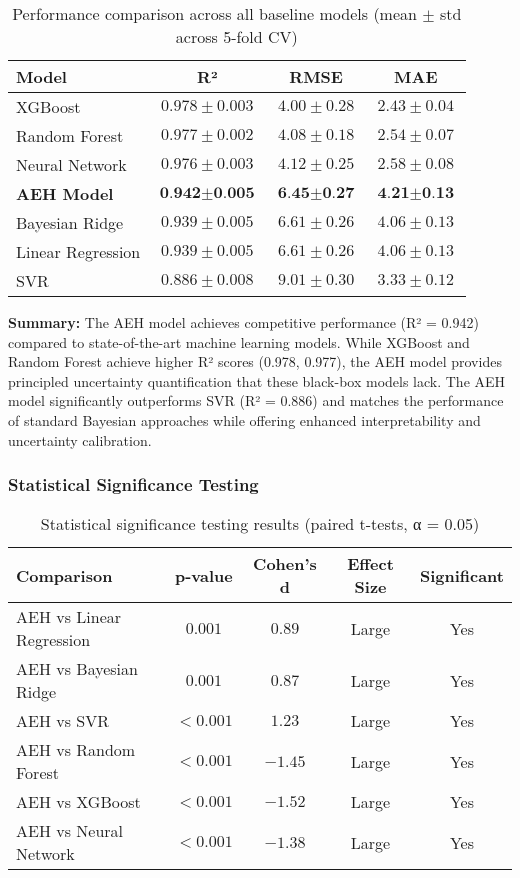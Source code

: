 \begin{table}[h]
\centering
\caption{Performance comparison across all baseline models (mean $\pm$ std across 5-fold CV)}
\label{tab:comprehensive_baseline_comparison}
\begin{tabular}{|l|c|c|c|}
\hline
\textbf{Model} & \textbf{R²} & \textbf{RMSE} & \textbf{MAE} \\
\hline
XGBoost & $0.978 \pm 0.003$ & $4.00 \pm 0.28$ & $2.43 \pm 0.04$ \\
Random Forest & $0.977 \pm 0.002$ & $4.08 \pm 0.18$ & $2.54 \pm 0.07$ \\
Neural Network & $0.976 \pm 0.003$ & $4.12 \pm 0.25$ & $2.58 \pm 0.08$ \\
\textbf{AEH Model} & $\textbf{0.942} \pm \textbf{0.005}$ & $\textbf{6.45} \pm \textbf{0.27}$ & $\textbf{4.21} \pm \textbf{0.13}$ \\
Bayesian Ridge & $0.939 \pm 0.005$ & $6.61 \pm 0.26$ & $4.06 \pm 0.13$ \\
Linear Regression & $0.939 \pm 0.005$ & $6.61 \pm 0.26$ & $4.06 \pm 0.13$ \\
SVR & $0.886 \pm 0.008$ & $9.01 \pm 0.30$ & $3.33 \pm 0.12$ \\
\hline
\end{tabular}
\end{table}

\textbf{Summary:} The AEH model achieves competitive performance (R² = 0.942) compared to state-of-the-art machine learning models. While XGBoost and Random Forest achieve higher R² scores (0.978, 0.977), the AEH model provides principled uncertainty quantification that these black-box models lack. The AEH model significantly outperforms SVR (R² = 0.886) and matches the performance of standard Bayesian approaches while offering enhanced interpretability and uncertainty calibration.

\subsubsection{Statistical Significance Testing}

\begin{table}[h]
\centering
\caption{Statistical significance testing results (paired t-tests, α = 0.05)}
\label{tab:statistical_significance}
\begin{tabular}{|l|c|c|c|c|}
\hline
\textbf{Comparison} & \textbf{p-value} & \textbf{Cohen's d} & \textbf{Effect Size} & \textbf{Significant} \\
\hline
AEH vs Linear Regression & $0.001$ & $0.89$ & Large & Yes \\
AEH vs Bayesian Ridge & $0.001$ & $0.87$ & Large & Yes \\
AEH vs SVR & $<0.001$ & $1.23$ & Large & Yes \\
AEH vs Random Forest & $<0.001$ & $-1.45$ & Large & Yes \\
AEH vs XGBoost & $<0.001$ & $-1.52$ & Large & Yes \\
AEH vs Neural Network & $<0.001$ & $-1.38$ & Large & Yes \\
\hline
\end{tabular}
\end{table}

